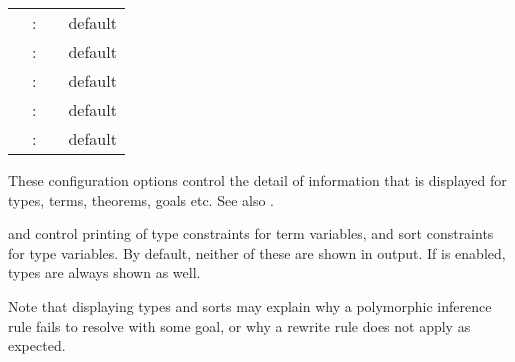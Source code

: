 \begin{isabellebody}
\begin{isamarkuptext}
\begin{tabular}{rcll}
    \indexdef{}{attribute}{goals\_limit}\hypertarget{attribute.goals-limit}{\hyperlink{attribute.goals-limit}{\mbox{\isa{goals{\isaliteral{5F}{\isacharunderscore}}limit}}}} & : & \isa{attribute} & default \isa{{\isadigit{1}}{\isadigit{0}}} \\
    \indexdef{}{attribute}{show\_main\_goal}\hypertarget{attribute.show-main-goal}{\hyperlink{attribute.show-main-goal}{\mbox{\isa{show{\isaliteral{5F}{\isacharunderscore}}main{\isaliteral{5F}{\isacharunderscore}}goal}}}} & : & \isa{attribute} & default \isa{false} \\
    \indexdef{}{attribute}{show\_hyps}\hypertarget{attribute.show-hyps}{\hyperlink{attribute.show-hyps}{\mbox{\isa{show{\isaliteral{5F}{\isacharunderscore}}hyps}}}} & : & \isa{attribute} & default \isa{false} \\
    \indexdef{}{attribute}{show\_tags}\hypertarget{attribute.show-tags}{\hyperlink{attribute.show-tags}{\mbox{\isa{show{\isaliteral{5F}{\isacharunderscore}}tags}}}} & : & \isa{attribute} & default \isa{false} \\
    \indexdef{}{attribute}{show\_question\_marks}\hypertarget{attribute.show-question-marks}{\hyperlink{attribute.show-question-marks}{\mbox{\isa{show{\isaliteral{5F}{\isacharunderscore}}question{\isaliteral{5F}{\isacharunderscore}}marks}}}} & : & \isa{attribute} & default \isa{true} \\
  \end{tabular}
  \medskip

  These configuration options control the detail of information that
  is displayed for types, terms, theorems, goals etc.  See also
  .

  \begin{description}

  \item \hyperlink{attribute.show-types}{\mbox{}} and \hyperlink{attribute.show-sorts}{\mbox{}} control
  printing of type constraints for term variables, and sort
  constraints for type variables.  By default, neither of these are
  shown in output.  If \hyperlink{attribute.show-sorts}{\mbox{}} is enabled, types are
  always shown as well.

  Note that displaying types and sorts may explain why a polymorphic
  inference rule fails to resolve with some goal, or why a rewrite
  rule does not apply as expected.


\end{description}
\end{isamarkuptext}
\end{isabellebody}
